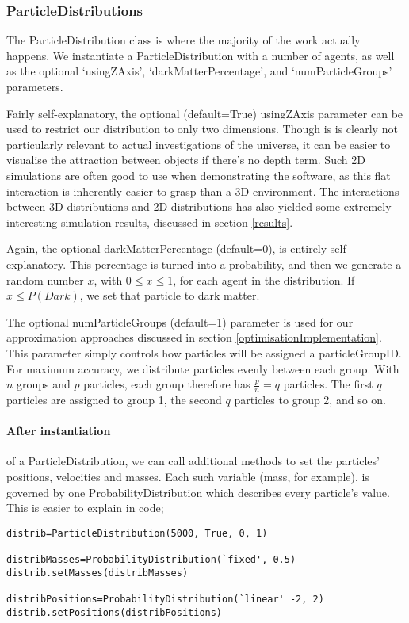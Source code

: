\documentclass[11pt,a4paper]{article}
\begin{document}
\subsubsection{ParticleDistributions}
The ParticleDistribution class is where the majority of the work actually happens. We instantiate a ParticleDistribution with a number of agents, as well as the optional `usingZAxis', `darkMatterPercentage', and `numParticleGroups' parameters.

Fairly self-explanatory, the optional (default=True) usingZAxis parameter can be used to restrict our distribution to only two dimensions. Though is is clearly not particularly relevant to actual investigations of the universe, it can be easier to visualise the attraction between objects if there's no depth term. Such 2D simulations are often good to use when demonstrating the software, as this flat interaction is inherently easier to grasp than a 3D environment. The interactions between 3D distributions and 2D distributions has also yielded some extremely interesting simulation results, discussed in section \ref{results}.

Again, the optional darkMatterPercentage (default=0), is entirely self-explanatory. This percentage is turned into a probability, and then we generate a random number $x$, with $0\leq x \leq 1$, for each agent in the distribution. If $x\leq P(Dark)$, we set that particle to dark matter.

The optional numParticleGroups (default=1) parameter is used for our approximation approaches discussed in section \ref{optimisationImplementation}. This parameter simply controls how particles will be assigned a particleGroupID. For maximum accuracy, we distribute particles evenly between each group. With $n$ groups and $p$ particles, each group therefore has $\frac{p}{n}=q$ particles. The first $q$ particles are assigned to group 1, the second $q$ particles to group 2, and so on.

\paragraph{After instantiation} of a ParticleDistribution, we can call additional methods to set the particles' positions, velocities and masses. Each such variable (mass, for example), is governed by one ProbabilityDistribution which describes every particle's value. This is easier to explain in code; 

\begin{lstlisting}
distrib=ParticleDistribution(5000, True, 0, 1)

distribMasses=ProbabilityDistribution(`fixed', 0.5)
distrib.setMasses(distribMasses)

distribPositions=ProbabilityDistribution(`linear' -2, 2)
distrib.setPositions(distribPositions)
\end{lstlisting}
\end{document}
